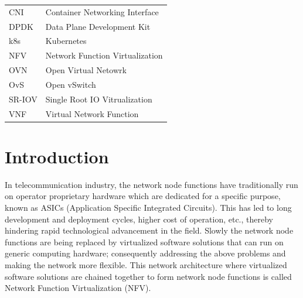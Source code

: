\documentclass[english, 12pt, a4paper, elec, utf8, a-1b, online]{aaltothesis}
\begin{document}
\thesistableofcontents


\begin{tabular}{ll}
CNI         & Container Networking Interface \\
DPDK        & Data Plane Development Kit \\
k8s         & Kubernetes \\
NFV         & Network Function Virtualization \\
OVN         & Open Virtual Netowrk \\
OvS         & Open vSwitch \\
SR-IOV      & Single Root IO Vitrualization \\
VNF         & Virtual Network Function \\
\end{tabular}


\cleardoublepage

\section{Introduction}

\thispagestyle{empty}
In telecommunication industry, the network node functions have traditionally run on operator proprietary hardware which are dedicated for a specific purpose, known as ASICs (Application Specific Integrated Circuits). This has led to long development and deployment cycles, higher cost of operation, etc., thereby hindering rapid technological advancement in the field. Slowly the network node functions are being replaced by virtualized software solutions that can run on generic computing hardware; consequently addressing the above problems and making the network more flexible. This network architecture where virtualized software solutions are chained together to form network node functions is called Network Function Virtualization (NFV).
\end{document}
